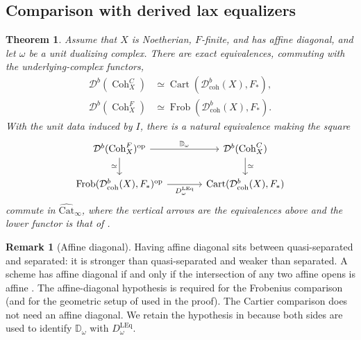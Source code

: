 \documentclass[11pt]{amsart}
\newcommand{\Cart}{\operatorname{Cart}}
\newcommand{\op}{{\operatorname{op}}}
\newcommand{\Coh}{\operatorname{{Coh}}}
\newcommand{\Catbig}{\widehat{\mathrm{Cat}}}
\newcommand{\Frob}{\operatorname{Frob}}
\newcommand{\Dbc}{\mathcal D^b_{\mathrm{coh}}}
\newcommand{\Db}{\mathcal D^b}
\theoremstyle{plain}
\newtheorem{theorem}[theorem]{Theorem}
\theoremstyle{definition}
\newtheorem{remark}[remark]{Remark}
\numberwithin{equation}{section}
\begin{document}
\subsection{Comparison with derived lax equalizers}
\begin{theorem}\label{thm:comparison}
Assume that $X$ is Noetherian, $F$-finite, and has affine diagonal, and let $\omega$ be a unit dualizing complex.
There are exact equivalences, commuting with the underlying-complex functors,
\begin{align*}
 \Db(\Coh^C_X)&\simeq\Cart(\Dbc(X),F_*),\\
 \Db(\Coh^F_X)&\simeq\Frob(\Dbc(X),F_*).
\end{align*}
With the unit data induced by $I$, there is a natural equivalence making the square
\[
\begin{tikzcd}[column sep=large]
 \Db(\Coh^F_X)^{\op}\ar[r,"\mathbb D_\omega"]\ar[d,"\simeq"']&
 \Db(\Coh^C_X)\ar[d,"\simeq"]\\
 \Frob(\Dbc(X),F_*)^{\op}\ar[r,"D^{\mathrm{LEq}}_\omega"']&\Cart(\Dbc(X),F_*)
\end{tikzcd}
\]
commute in $\Catbig_\infty$, where the vertical arrows are the equivalences above and the lower functor is that of .
\end{theorem}
\begin{remark}[Affine diagonal]\label{rem:affine-diagonal}
Having affine diagonal sits between quasi-separated and separated: it is stronger than quasi-separated and weaker than separated.
A scheme has affine diagonal if and only if the intersection of any two affine opens is affine \cite[\href{https://stacks.math.columbia.edu/tag/0BDX}{Tag 0BDX}]{SP}.
The affine-diagonal hypothesis is required for the Frobenius comparison \cite[Theorem 5.7]{MWF} (and for the geometric setup of \cite[Definition 4.10]{MWF} used in the proof).
The Cartier comparison \cite[Theorem 5.1; Corollary 6.2]{MWC} does not need an affine diagonal.
We retain the hypothesis in  because both sides are used to identify $\mathbb D_\omega$ with $D^{\mathrm{LEq}}_\omega$.
\end{remark}
\end{document}
